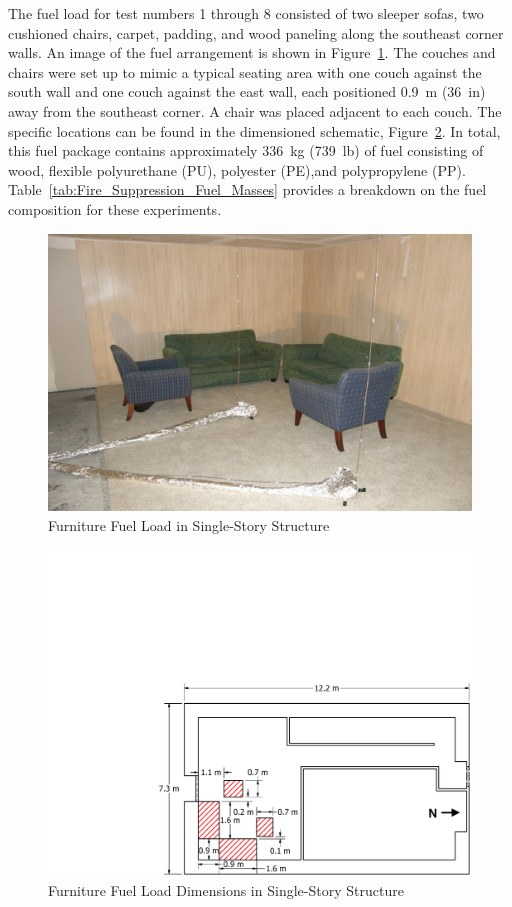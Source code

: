 \documentclass[12pt,oneside]{book}
\begin{document}
The fuel load for test numbers 1 through 8 consisted of two sleeper sofas, two cushioned chairs, carpet, padding, and wood paneling along the southeast corner walls. An image of the fuel arrangement is shown in Figure~\ref{fig:Furniture_Fuel_Load}. The couches and chairs were set up to mimic a typical seating area with one couch against the south wall and one couch against the east wall, each positioned 0.9~m (36~in) away from the southeast corner. A chair was placed adjacent to each couch. The specific locations can be found in the dimensioned schematic, Figure~\ref{fig:Furniture_Fuel_Load_Dimensions}. In total, this fuel package contains approximately 336~kg (739~lb) of fuel consisting of wood, flexible polyurethane (PU), polyester (PE),and polypropylene (PP). Table~\ref{tab:Fire_Suppression_Fuel_Masses} provides a breakdown on the fuel composition for these experiments.

\begin{figure}[!ht]
	\includegraphics[width=.8\columnwidth]{../Figures/Pictures/Furniture_Fuel_Load}
	\caption{Furniture Fuel Load in Single-Story Structure}
	\label{fig:Furniture_Fuel_Load}
\end{figure}

\begin{figure}[!ht]
	\includegraphics[width=\columnwidth]{../Figures/Floor_Plans/PDFs/East_Structure/DelCo_2012_East_Structure_Furniture}
	\caption{Furniture Fuel Load Dimensions in Single-Story Structure}
	\label{fig:Furniture_Fuel_Load_Dimensions}
\end{figure}
\end{document}
